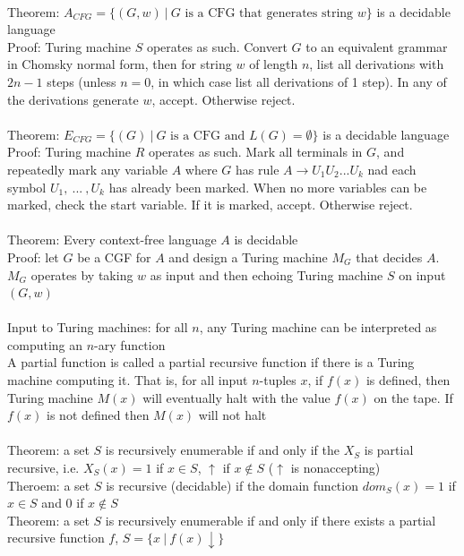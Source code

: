 \documentclass{article}
\newcommand*{\<}{\langle}
\renewcommand*{\>}{\rangle}
\begin{document}
			\\
			Theorem: $A_{CFG} = \{(G, w)\:|\:G\text{ is a CFG that generates string }w\}$ is a decidable language \\
			Proof: Turing machine $S$ operates as such. Convert $G$ to an equivalent grammar in Chomsky normal form, then for string $w$ of length $n$, list all derivations with $2n - 1$ steps (unless $n = 0$, in which case list all derivations of 1 step). In any of the derivations generate $w$, accept. Otherwise reject. \\
			\\
			Theorem: $E_{CFG} = \{(G)\:|\:G\text{ is a CFG and }L(G) = \emptyset\}$ is a decidable language \\
			Proof: Turing machine $R$ operates as such. Mark all terminals in $G$, and repeatedly mark any variable $A$ where $G$ has rule $A \to U_1U_2...U_k$ nad each symbol $U_1,\:...\:, U_k$ has already been marked. When no more variables can be marked, check the start variable. If it is marked, accept. Otherwise reject. \\
			\\
			Theorem: Every context-free language $A$ is decidable \\
			Proof: let $G$ be a CGF for $A$ and design a Turing machine $M_G$ that decides $A$. $M_G$ operates by taking $w$ as input and then echoing Turing machine $S$ on input $(G, w)$ \\
			\\
			Input to Turing machines: for all $n$, any Turing machine can be interpreted as computing an $n$-ary function \\
			A partial function is called a partial recursive function if there is a Turing machine computing it. That is, for all input $n$-tuples $x$, if $f(x)$ is defined, then Turing machine $M(x)$ will eventually halt with the value $f(x)$ on the tape. If $f(x)$ is not defined then $M(x)$ will not halt \\
			\\
			Theorem: a set $S$ is recursively enumerable if and only if the $X_S$ is partial recursive, i.e. $X_S(x) = 1$ if $x \in S$, $\uparrow$ if $x \notin S$ ($\uparrow$ is nonaccepting) \\
			Theroem: a set $S$ is recursive (decidable) if the domain function $dom_S(x) = 1$ if $x \in S$ and $0$ if $x \notin S$ \\
			Theorem: a set $S$ is recursively enumerable if and only if there exists a partial recursive function $f$, $S = \{x\:|\:f(x)\downarrow\}$
\end{document}
